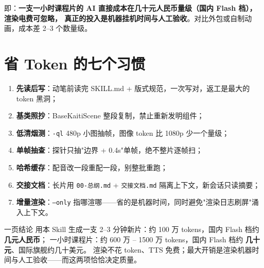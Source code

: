 \documentclass[12pt,a4paper]{ctexart}
\newcommand{\code}[1]{\texttt{\small #1}}
\begin{document}
即：\textbf{一支一小时课程片的 AI 直接成本在几十元人民币量级（国内 Flash 档），渲染电费可忽略，
真正的投入是机器挂机时间与人工验收}。对比外包或自制动画，成本差 2--3 个数量级。

\section{省 Token 的七个习惯}

\begin{enumerate}
    \item \textbf{先读后写}：动笔前读完 SKILL.md + 版式规范，一次写对，返工是最大的 token 黑洞；
    \item \textbf{基类照抄}：BaseKaitiScene 整段复制，禁止重新发明组件；
    \item \textbf{低清烟测}：\code{-ql} 480p 小图抽帧，图像 token 比 1080p 少一个量级；
    \item \textbf{单帧抽查}：探针只抽"边界 + 0.4s"单帧，绝不整片逐帧扫；
    \item \textbf{哈希缓存}：配音改一段重配一段，别整批重跑；
    \item \textbf{交接文档}：长片用 \code{00-总纲.md} + \code{交接文档.md} 隔离上下文，新会话只读摘要；
    \item \textbf{增量渲染}：\code{--only} 指哪渲哪——省的是机器时间，同时避免"渲染日志刷屏"涌入上下文。
\end{enumerate}

\vspace{0.4cm}
\begin{okbox}{一页结论}
用本 Skill 生成一支 2--3 分钟新片：约 100 万 tokens，国内 Flash 档约 \textbf{几元人民币}；
一小时课程片：约 600 万 -- 1500 万 tokens，国内 Flash 档约 \textbf{几十元}、国际旗舰约几十美元。
渲染不花 token、TTS 免费；最大开销是渲染机器时间与人工验收——而这两项恰恰决定质量。
\end{okbox}
\end{document}
